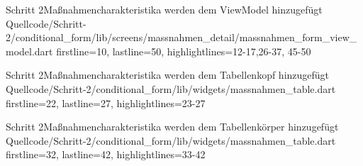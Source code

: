\begin{alexlisting}{Schritt 2}{Maßnahmencharakteristika werden dem ViewModel hinzugefügt}
  {Quellcode/Schritt-2/conditional_form/lib/screens/massnahmen_detail/massnahmen_form_view_model.dart}
  {firstline=10, lastline=50, highlightlines={12-17,26-37, 45-50}}
  \label{lst:Schritt2MaßnahmencharakteristikaWerdenDemViewModelHinzugefuegt}
\end{alexlisting}

\begin{alexlisting}{Schritt 2}{Maßnahmencharakteristika werden dem Tabellenkopf hinzugefügt}
  {Quellcode/Schritt-2/conditional_form/lib/widgets/massnahmen_table.dart}
  {firstline=22, lastline=27, highlightlines={23-27}}
  \label{lst:Schritt2MaßnahmencharakteristikaEerdenDemTabellenkopfHinzugefuegt}
\end{alexlisting}


\begin{alexlisting}{Schritt 2}{Maßnahmencharakteristika werden dem Tabellenkörper hinzugefügt}
  {Quellcode/Schritt-2/conditional_form/lib/widgets/massnahmen_table.dart}
  {firstline=32, lastline=42, highlightlines={33-42}}
  \label{lst:Schritt2MaßnahmencharakteristikaWerdenDemTabellenkoerperHinzugefuegt}
\end{alexlisting}


\clearpage 
